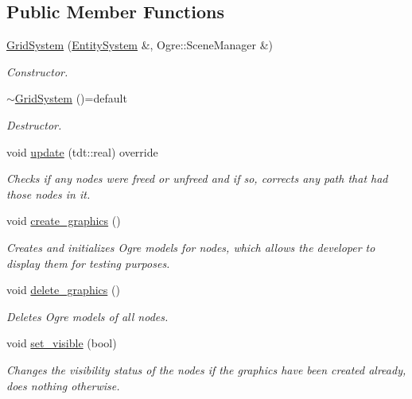 \subsection*{Public Member Functions}
\begin{DoxyCompactItemize}
\item 
\hyperlink{class_grid_system_ad868e83a3ef915ba1c1e7d04d5deb8b9}{Grid\+System} (\hyperlink{class_entity_system}{Entity\+System} \&, Ogre\+::\+Scene\+Manager \&)
\begin{DoxyCompactList}\small\item\em Constructor. \end{DoxyCompactList}\item 
\hyperlink{class_grid_system_a7d1f6270ebd9fc98d2647e879b71125c}{$\sim$\+Grid\+System} ()=default
\begin{DoxyCompactList}\small\item\em Destructor. \end{DoxyCompactList}\item 
void \hyperlink{class_grid_system_a4a63a4d431ce96dadcbb1603a88bf71b}{update} (tdt\+::real) override
\begin{DoxyCompactList}\small\item\em Checks if any nodes were freed or unfreed and if so, corrects any path that had those nodes in it. \end{DoxyCompactList}\item 
void \hyperlink{class_grid_system_aa49a509dc8a59c53f9cc043892842f90}{create\+\_\+graphics} ()
\begin{DoxyCompactList}\small\item\em Creates and initializes Ogre models for nodes, which allows the developer to display them for testing purposes. \end{DoxyCompactList}\item 
void \hyperlink{class_grid_system_acce98eec795358ddf184934db96c04b2}{delete\+\_\+graphics} ()
\begin{DoxyCompactList}\small\item\em Deletes Ogre models of all nodes. \end{DoxyCompactList}\item 
void \hyperlink{class_grid_system_aae965431008678ee374fe67e0bc90734}{set\+\_\+visible} (bool)
\begin{DoxyCompactList}\small\item\em Changes the visibility status of the nodes if the graphics have been created already, does nothing otherwise. \end{DoxyCompactList}\item 

\end{DoxyCompactItemize}
